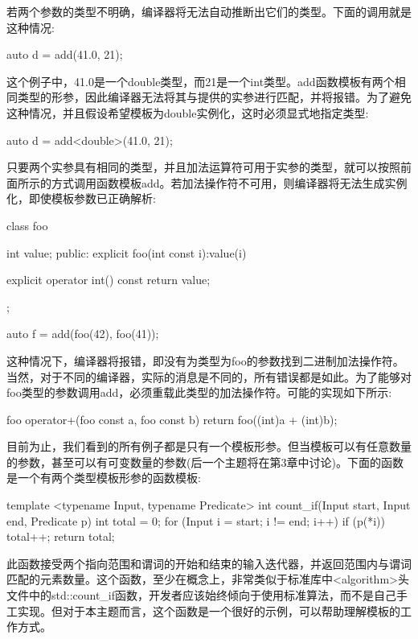 若两个参数的类型不明确，编译器将无法自动推断出它们的类型。下面的调用就是这种情况:

\begin{cpp}
auto d = add(41.0, 21);
\end{cpp}

这个例子中，41.0是一个double类型，而21是一个int类型。add函数模板有两个相同类型的形参，因此编译器无法将其与提供的实参进行匹配，并将报错。为了避免这种情况，并且假设希望模板为double实例化，这时必须显式地指定类型:

\begin{cpp}
auto d = add<double>(41.0, 21);
\end{cpp}

只要两个实参具有相同的类型，并且加法运算符可用于实参的类型，就可以按照前面所示的方式调用函数模板add。若加法操作符不可用，则编译器将无法生成实例化，即使模板参数已正确解析:

\begin{cpp}
class foo
{
	int value;
public:
	explicit foo(int const i):value(i)
	{ }
	
	explicit operator int() const { return value; }
};

auto f = add(foo(42), foo(41));
\end{cpp}

这种情况下，编译器将报错，即没有为类型为foo的参数找到二进制加法操作符。当然，对于不同的编译器，实际的消息是不同的，所有错误都是如此。为了能够对foo类型的参数调用add，必须重载此类型的加法操作符。可能的实现如下所示:

\begin{cpp}
foo operator+(foo const a, foo const b)
{
	return foo((int)a + (int)b);
}
\end{cpp}

目前为止，我们看到的所有例子都是只有一个模板形参。但当模板可以有任意数量的参数，甚至可以有可变数量的参数(后一个主题将在第3章中讨论)。下面的函数是一个有两个类型模板形参的函数模板:

\begin{cpp}
template <typename Input, typename Predicate>
int count_if(Input start, Input end, Predicate p)
{
	int total = 0;
	for (Input i = start; i != end; i++)
	{
		if (p(*i))
			total++;
	}
	return total;
}
\end{cpp}

此函数接受两个指向范围和谓词的开始和结束的输入迭代器，并返回范围内与谓词匹配的元素数量。这个函数，至少在概念上，非常类似于标准库中<algorithm>头文件中的std::count\_if函数，开发者应该始终倾向于使用标准算法，而不是自己手工实现。但对于本主题而言，这个函数是一个很好的示例，可以帮助理解模板的工作方式。

